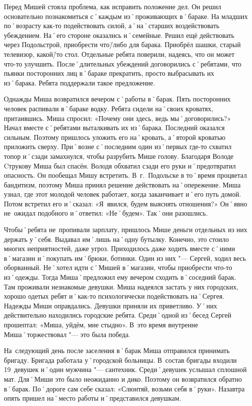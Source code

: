 Перед Мишей стояла проблема, как исправить положение дел. Он решил основательно познакомиться с˚каждым из˚проживающих в˚бараке. На младших по˚возрасту как-то подействовать силой, а˚на˚старших воздействовать убеждением. На˚его стороне оказались и˚семейные. Решил ещё действовать через Подольстрой, приобрести что\=/либо для барака. Приобрёл шашки, старый телевизор, какой\=/то стол. Отдельные ребята поверили, надеясь, что он может что-то улучшить. После˚длительных убеждений договорились с˚ребятами, что пьянки посторонних лиц в˚бараке прекратить, просто выбрасывать их из˚барака. Ребята поддержали такое предложение.

Однажды Миша возвратился вечером с˚работы в˚барак. Пять посторонних человек распивали в˚бараке водку. Ребята сидели на˚своих кроватях, притаившись. Миша спросил: «Почему они здесь, ведь мы˚договорились?» Начал вместе с˚ребятами выталкивать их из˚барака. Последний оказался сильным. Поэтому пришлось уложить его на˚кровать, а˚второй кроватью приложить сверху. При˚возне с˚последним один из˚первых где-то схватил топор и˚сзади замахнулся, чтобы разрубить Мише голову. Благодаря Володе Cтрукову Миша был спасён. Володя обхватил сзади его руки и˚предотвратил опасность. Он пообещал Мишу встретить. В~г.~Подольске в то˚время процветал бандитизм, поэтому Миша принял решение действовать на˚опережение. Миша узнал, где этот молодой человек работает, когда заканчивает и˚его путь домой. Потом встретил его и˚сказал: «Я~явился, будем выяснять отношения?» Он˚явно не~ожидал подобного и˚ответил: «Не˚будем». Так˚они разошлись.

Чтобы˚ребята не~пропивали зарплату, пришлось Мише деньги отдельных из них держать у˚себя. Выдавал им˚лишь на˚одну бутылку. Конечно, это стоило многих неприятностей, даже угроз. Приходилось даже ходить вместе с˚ними в˚магазин и˚покупать им˚брюки, ботинки. Один из них "--- Сергей, ходил весь оборванный. Не˚хотел идти с˚Мишей в˚магазин, чтобы приобрести что-то из˚одежды. Тогда Миша˚предложил ему вечером сходить в˚соседний барак. Там проживали незнакомые девушки. Миша надеялся застать у них городских, хорошо одетых ребят и˚как-то психологически подействовать на˚Сергея. Надежды Миши оправдались. Девушки приняли их приветливо. У˚них действительно находились городские ребята. Среди˚одной из˚бесед Сергей прошептал: «Миша, уйдём, мне стыдно». В~это время внутренне Миша˚торжествовал "--- это была победа.

На~следующий день после заселения в˚барак Миша отправился принимать бригаду. Бригада работала у˚городской больницы. В~состав бригады входили 19~девушек и˚один мужчина "--- сантехник. Среди˚девушек услышал сплошной мат. Для˚Миши это было неожиданно и дико. Поэтому он возвратился обратно в˚барак. По˚дороге сам себе сказал: «Слюнтяй, возьми себя в˚руки». Назавтра опять пришел на˚место работы и˚представился девушкам.

